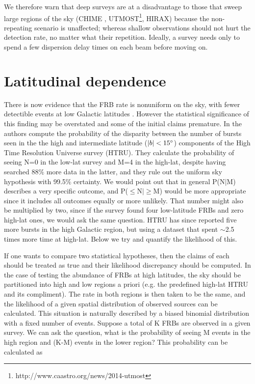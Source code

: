 \documentclass[useAMS,usenatbib]{mn2e}
\begin{document}
We therefore warn that deep surveys are at a disadvantage 
to those that sweep large regions of the sky 
(CHIME  \citep{2014SPIE.9145E..22B}, 
UTMOST\footnote{http://www.caastro.org/news/2014-utmost}, HIRAX)
because the non-repeating 
scenario is unaffected; whereas shallow observations 
should not hurt the detection rate, no matter what their repetition. 
Ideally, a survey
needs only to spend a few dispersion delay times on each beam 
before moving on. 

\section{Latitudinal dependence}
\label{latitude}
There is now evidence that the FRB rate is nonuniform on the sky, 
with fewer detectible events at low Galactic latitudes \citep{2014ira..book.....B}.
However the statistical significance of this finding may be 
overstated and some of the initial claims premature. In \cite{2014ApJ...789L..26P}
the authors compute the probability of the disparity between the number of 
bursts seen in the the high and intermediate latitude ($|b| < 15\degree$)
 components of the High Time Resolution Universe survey 
(HTRU). They calculate the probability of seeing N=0 in the low-lat survey and M=4 in 
the high-lat, despite having searched 88$\%$ more data in the latter, and they 
rule out the uniform sky hypothesis with 99.5$\%$ certainty. We would point out 
that in general P(N$|$M) describes a very specific outcome, and P($\le$N$|\ge$M) would be 
more appropriate since it includes all outcomes equally or more unlikely.
That number might also be multiplied by two, since if the survey found 
four low-latitude FRBs and zero high-lat ones, we would ask the same question. HTRU 
has since reported five more bursts in the high Galactic region, but using a dataset 
that spent $\sim$2.5 times more time at high-lat. Below we try and quantify the likelihood of 
this.


If one wants to 
compare two statistical hypotheses, then the claims of each should 
be treated as true and their likelihood discrepancy should be computed.
In the case of testing the abundance of FRBs at high latitudes,
the sky should be partitioned into high and low regions a priori 
(e.g. the predefined high-lat HTRU and its compliment). The rate in both regions 
is then taken to be the same, and the likelihood of a given spatial distribution of observed
sources can be calculated. This situation is naturally
described by a biased binomial distribution with a fixed number of events. Suppose
a total of K FRBs are observed in a given survey. We can ask the question, what is the probability of 
seeing M events in the high region and (K-M) events in the lower region? 
This probability can be calculated %
as 
\end{document}
